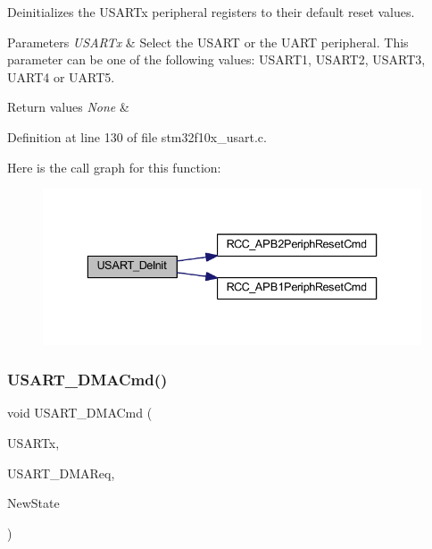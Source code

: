 Deinitializes the U\+S\+A\+R\+Tx peripheral registers to their default reset values. 


\begin{DoxyParams}{Parameters}
{\em U\+S\+A\+R\+Tx} & Select the U\+S\+A\+RT or the U\+A\+RT peripheral. This parameter can be one of the following values\+: U\+S\+A\+R\+T1, U\+S\+A\+R\+T2, U\+S\+A\+R\+T3, U\+A\+R\+T4 or U\+A\+R\+T5. \\
\hline
\end{DoxyParams}

\begin{DoxyRetVals}{Return values}
{\em None} & \\
\hline
\end{DoxyRetVals}


Definition at line 130 of file stm32f10x\+\_\+usart.\+c.

Here is the call graph for this function\+:
\nopagebreak
\begin{figure}[H]
\begin{center}
\leavevmode
\includegraphics[width=336pt]{group___u_s_a_r_t___private___functions_ga2f8e1ce72da21b6539d8e1f299ec3b0d_cgraph}
\end{center}
\end{figure}
\mbox{\label{group___u_s_a_r_t___private___functions_ga902857f199ebfba21c63d725354af66f}} 
\subsubsection{\texorpdfstring{U\+S\+A\+R\+T\+\_\+\+D\+M\+A\+Cmd()}{USART\_DMACmd()}}
{\footnotesize\ttfamily void U\+S\+A\+R\+T\+\_\+\+D\+M\+A\+Cmd (\begin{DoxyParamCaption}\item[{\hyperlink{struct_u_s_a_r_t___type_def}{U\+S\+A\+R\+T\+\_\+\+Type\+Def} $\ast$}]{U\+S\+A\+R\+Tx,  }\item[{uint16\+\_\+t}]{U\+S\+A\+R\+T\+\_\+\+D\+M\+A\+Req,  }\item[{\hyperlink{group___exported__types_gac9a7e9a35d2513ec15c3b537aaa4fba1}{Functional\+State}}]{New\+State }\end{DoxyParamCaption})}



